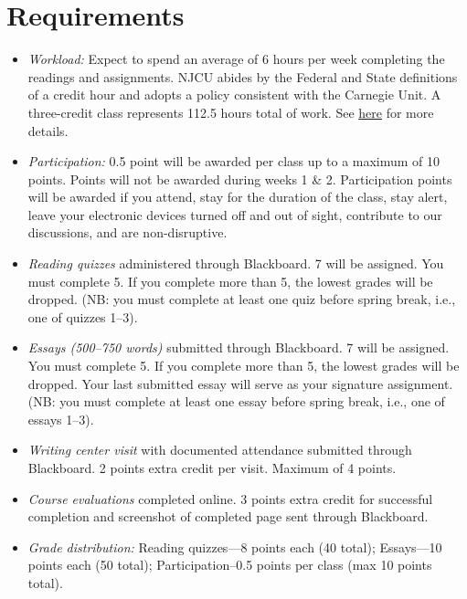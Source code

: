 \documentclass[article,oneside]{memoir}
\begin{document}
\section{Requirements}

\begin{itemize}
\item \textit{Workload:} Expect to spend an average of 6 hours per week completing the readings and assignments. NJCU abides by the Federal and State definitions of a credit hour and adopts a policy consistent with the Carnegie Unit. A three-credit class represents 112.5 hours total of work. See \href{http://scottoconnor.org/resources/Credit.pdf}{here} for more details.

\item \textit{Participation:}  0.5 point will be awarded per class up to a maximum of 10 points. Points will not be awarded during weeks 1 \& 2. Participation points will be awarded if you attend, stay for the duration of the class, stay alert, leave your electronic devices turned off and out of sight, contribute to our discussions, and are non-disruptive. 

\item \textit{Reading quizzes} administered through Blackboard. 7 will be assigned. You must complete 5. If you complete more than 5, the lowest grades will be dropped. (NB: you must complete at least one quiz before spring break, i.e., one of quizzes 1--3).

\item \textit{Essays (500--750 words)} submitted through Blackboard. 7 will be assigned. You must complete 5. If you complete more than 5, the lowest grades will be dropped. Your last submitted essay will serve as your signature assignment. (NB: you must complete at least one essay before spring break, i.e., one of essays 1--3).

\item \textit{Writing center visit} with documented attendance submitted through Blackboard. 2 points extra credit per visit. Maximum of 4 points.  


\item \textit{Course evaluations} completed online. 3 points extra credit for successful completion and screenshot of completed page sent through Blackboard. 
  
\item \textit{Grade distribution:} Reading quizzes---8 points each (40 total);  Essays---10 points each (50 total); Participation--0.5 points per class (max 10 points total). 



\end{itemize}
\end{document}

